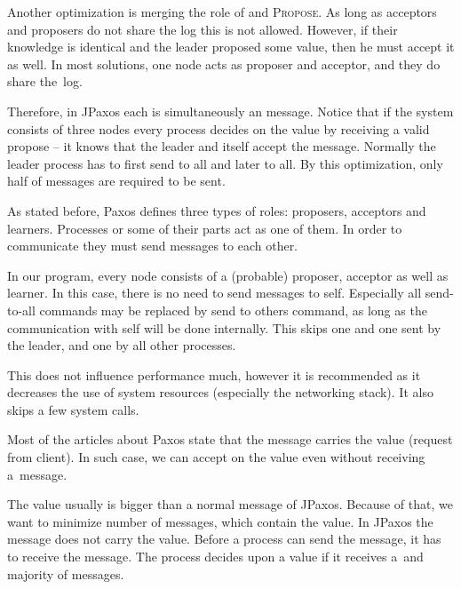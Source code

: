 
Another optimization is merging the role of \accept and \textsc{Propose}. As long as \linebreak acceptors and proposers do not share the log this is not allowed. However, if their knowledge is identical and the leader proposed some value, then he must accept it as well. In most solutions, one node acts as proposer and acceptor, and they do share the~log.

Therefore, in JPaxos each \propose is simultaneously an \accept message. Notice that if the system consists of three nodes every process decides on the value by receiving a valid propose -- it knows that the leader and itself
accept the message. Normally the leader process has to first send \propose to all and later \accept to all. By this optimization, only half of messages are required to be sent.


As stated before, Paxos defines three types of roles: proposers, acceptors and learners. Processes or some of their parts act as one of them. In order to communicate they must send messages to each other.

In our program, every node consists of a (probable) proposer, acceptor as well as learner. In this case, there is no need to send messages to self. Especially all send-to-all commands may be replaced by send to others command, as long as the communication with self will be done internally. This skips one \accept and one \propose sent by the leader, and one \accept by all other processes.

This does not influence performance much, however it is recommended as it decreases the use of system resources (especially the networking stack). It also skips a few system calls.


Most of the articles about Paxos state that the \accept message carries the value (request from client).
In such case, we can accept on the value even without receiving a~\propose message.

The value usually is bigger than a normal message of JPaxos. Because of that, we want to minimize number of messages, which contain the value.
In JPaxos the \accept message does not carry the value. Before a process can send the \accept message, it has to receive the \propose message. The process decides upon a value if it receives a~\propose and majority of \accept messages.

